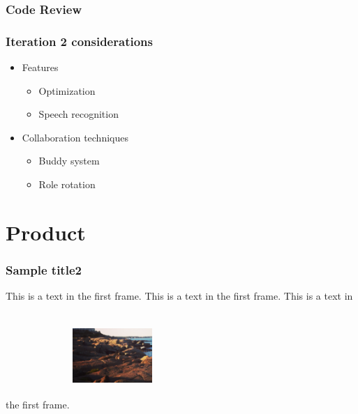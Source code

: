 \documentclass{beamer}
\begin{document}
  \begin{frame}
  \frametitle{Code Review}
  \end{frame}


  \begin{frame}
  \frametitle{Iteration 2 considerations}
  \begin{itemize}
   \item Features
    \begin{itemize}
     \item Optimization
     \item Speech recognition
    \end{itemize}
   \item Collaboration techniques
    \begin{itemize}
     \item Buddy system
     \item Role rotation
    \end{itemize}
  \end{itemize}
  \end{frame}



\section{Product}
\begin{frame}
\frametitle{Sample title2}
This is a text in the first frame. This is a text in the first frame. This is a text in the first frame.
\includegraphics[width=3cm, height=4cm]{Screen Shot}
\end{frame}

  
\end{document}
